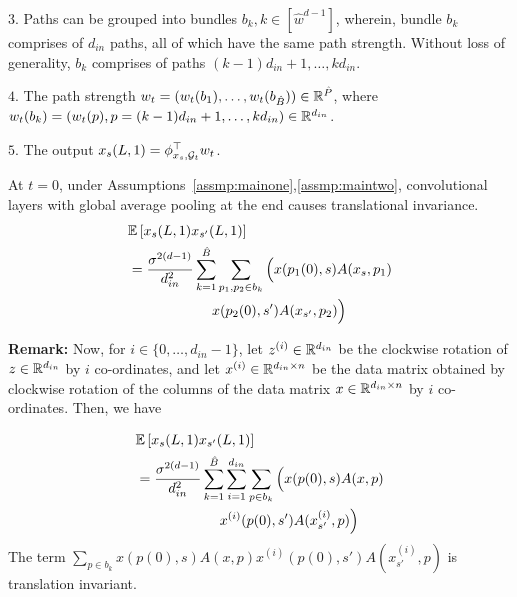 $3.$ Paths can be grouped into bundles $b_k,k\in[\hat{w}^{d-1}]$, wherein, bundle $b_k$ comprises of $d_{in}$ paths, all of which have the same path strength. Without loss of generality, $b_k$ comprises of paths $(k-1)d_{in}+1,\ldots, kd_{in}$.

$4.$ The path strength $w_t=(w_t(b_1),\ldots, w_t(b_{\hat{B}}))\in \mathbb{R}^{\hat{P}}$, where $w_t(b_k)=(w_t(p),p=(k-1)d_{in}+1,\ldots,kd_{in})\in \mathbb{R}^{d_{in}}$. 

$5.$ The output $x_s(L,1)=\phi^\top_{x_s,\mathcal{G}_t} w_t$.

\begin{lemma}\label{lm:invariance}
At $t=0$, under Assumptions~\ref{assmp:mainone},\ref{assmp:maintwo}, convolutional layers with global average pooling at the end causes translational invariance.
\begin{align*}
&\mathbb{E}\left[x_s(L,1)x_{s'}(L,1)\right]\\&=\frac{\sigma^{2(d-1)}}{d^2_{in}}\sum_{k=1}^{\hat{B}} \sum_{p_1,p_2\in b_k}  \Big( x(p_1(0),s) A(x_s,p_1)\\
&\quad\quad \quad\quad \quad\quad x(p_2(0),s') A(x_{s'},p_2) \Big)
\end{align*}
\end{lemma}

\textbf{Remark:} Now, for $i\in\{0,\ldots, d_{in}-1\}$, let $z^{(i)}\in \mathbb{R}^{d_{in}}$ be the clockwise rotation of $z\in \mathbb{R}^{d_{in}}$ by $i$ co-ordinates, and let $x^{(i)}\in \mathbb{R}^{d_{in}\times n}$ be the data matrix obtained by clockwise rotation of the columns of the data matrix $x\in \mathbb{R}^{d_{in}\times n}$ by $i$ co-ordinates. Then, we have

\begin{align*}
&\mathbb{E}\left[x_s(L,1)x_{s'}(L,1)\right]\\
&=\frac{\sigma^{2(d-1)}}{d^2_{in}}\sum_{k=1}^{\hat{B}} \sum_{i=1}^{d_{in}} \sum_{p\in b_k}   \Big(x(p(0),s) A(x,p) \\ 
&\quad\quad \quad\quad \quad\quad x^{(i)}(p(0),s') A(x^{(i)}_{s'},p) \Big)
\end{align*}
The term $\sum_{p\in b_k}  x(p(0),s) A(x,p) x^{(i)}(p(0),s') A(x^{(i)}_{s'},p)$ is translation invariant.


